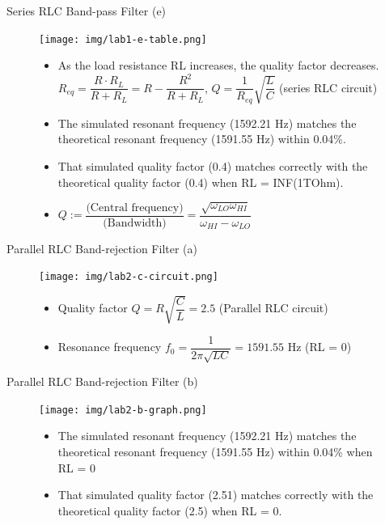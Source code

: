\documentclass[t, 10pt, handout]{beamer}
\begin{document}
\begin{frame}{Series RLC Band-pass Filter (e)}
    \begin{figure}
        \centering
        \texttt{[image: img/lab1-e-table.png]}
	\begin{itemize}
		\item As the load resistance RL increases, the quality factor decreases.
            \\ $R_{eq} = \dfrac{R \cdot R_L}{R + R_L} = R - \dfrac{R^2}{R + R_L}$, $Q = \dfrac{1}{R_{eq}}\sqrt{\dfrac{L}{C}}$ (series RLC circuit)
	\end{itemize}
	\begin{itemize}
		\item The simulated resonant frequency (1592.21 Hz) matches the theoretical resonant frequency (1591.55 Hz) within 0.04\%.
		\item That simulated quality factor (0.4) matches correctly with the theoretical quality factor (0.4) when RL = INF(1TOhm).
	\end{itemize}    
        \begin{itemize}
            \item $Q := \dfrac{\text{(Central frequency)}}{\text{(Bandwidth)}} = \dfrac{\sqrt{\omega_{LO}\omega_{HI}}}{\omega_{HI}-\omega_{LO}}$
        \end{itemize}
    \end{figure}
\end{frame}







\begin{frame}{Parallel RLC Band-rejection Filter (a)}
    \begin{figure}
        \centering
        \texttt{[image: img/lab2-c-circuit.png]}
        \begin{itemize}
		\item Quality factor $Q = R\sqrt{\dfrac{C}{L}} = 2.5$ (Parallel RLC circuit)
            \item Resonance frequency $f_0 = \dfrac{1}{2\pi\sqrt{LC}} = 1591.55$ Hz (RL = 0)
	\end{itemize}
    \end{figure}
\end{frame}

\begin{frame}{Parallel RLC Band-rejection Filter (b)}
    \begin{figure}
        \centering
        \texttt{[image: img/lab2-b-graph.png]}
	\begin{itemize}
            \item The simulated resonant frequency (1592.21 Hz) matches the theoretical resonant frequency (1591.55 Hz) within 0.04\% when RL = 0
		\item That simulated quality factor (2.51) matches correctly with the theoretical quality factor (2.5) when RL = 0.
	\end{itemize}   
    \end{figure}
\end{frame}
\end{document}
